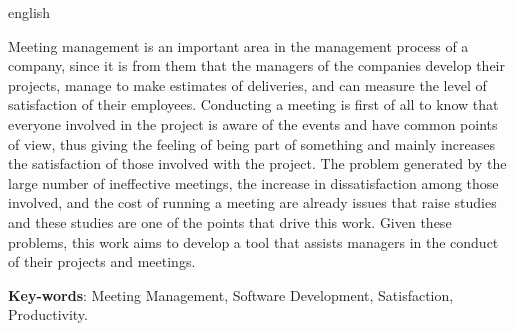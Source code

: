 \begin{resumo}[Abstract]
 \begin{otherlanguage*}{english}

  Meeting management is an important area in the management process of a company, since it is from them that the managers of the companies develop their projects, manage to make estimates of deliveries, and can measure the level of satisfaction of their employees. Conducting a meeting is first of all to know that everyone involved in the project is aware of the events and have common points of view, thus giving the feeling of being part of something and mainly increases the satisfaction of those involved with the project. The problem generated by the large number of ineffective meetings, the increase in dissatisfaction among those involved, and the cost of running a meeting are already issues that raise studies and these studies are one of the points that drive this work. Given these problems, this work aims to develop a tool that assists managers in the conduct of their projects and meetings.

   \vspace{\onelineskip}

   \noindent
   \textbf{Key-words}: Meeting Management, Software Development, Satisfaction, Productivity.
 \end{otherlanguage*}
\end{resumo}
